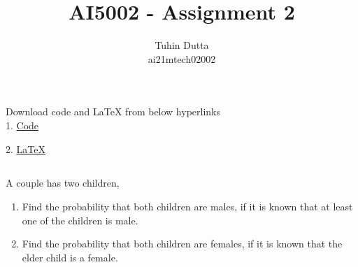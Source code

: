 \documentclass[journal,12pt,twocolumn]{IEEEtran}
\begin{document}
\providecommand{\mtx}[1]{\mathbf{#1}}
\providecommand{\fourier}{\overset{\mathcal{F}}{ \rightleftharpoons}}
\providecommand{\system}{\overset{\mathcal{H}}{ \longleftrightarrow}}
\newcommand{\solution}{\noindent \textbf{Solution: }}
\newcommand{\cosec}{\,\text{cosec}\,}
\providecommand{\dec}[2]{\ensuremath{\overset{#1}{\underset{#2}{\gtrless}}}}
\newcommand{\myvec}[1]{\ensuremath{\begin{pmatrix}#1\end{pmatrix}}}
\newcommand{\mydet}[1]{\ensuremath{\begin{vmatrix}#1\end{vmatrix}}}
\makeatletter
{}
\makeatother
\let\StandardTheFigure\thefigure
\let\vec\mathbf
\renewcommand{\thefigure}{\theproblem}
\def\putbox#1#2#3{\makebox[0in][l]{\makebox[#1][l]{}\raisebox{\baselineskip}[0in][0in]{\raisebox{#2}[0in][0in]{#3}}}}
     \def\rightbox#1{\makebox[0in][r]{#1}}
     \def\centbox#1{\makebox[0in]{#1}}
     \def\topbox#1{\raisebox{-\baselineskip}[0in][0in]{#1}}
     \def\midbox#1{\raisebox{-0.5\baselineskip}[0in][0in]{#1}}
\vspace{3cm}
\title{AI5002 - Assignment 2}
\author{Tuhin Dutta\\ ai21mtech02002}
\maketitle
\newpage
\bigskip
\renewcommand{\thefigure}{\theenumi}
\renewcommand{\thetable}{\theenumi}
\begin{mdframed}
Download code and LaTeX from below hyperlinks\\
1. \href{https://github.com/Tauhait/AI5002/Assignment-3/Codes}{Code}


2. \href{https://github.com/Tauhait/AI5002/Assignment-3/LaTeX}{LaTeX}
\end{mdframed}
\subsection*{}
A couple has two children,\\
\begin{enumerate}[label=\roman*.]
\item Find the probability that both children are
males, if it is known that at least one of the
children is male.
\item Find the probability that both children are
females, if it is known that the elder child is
a female.
\end{enumerate}
\end{document}

